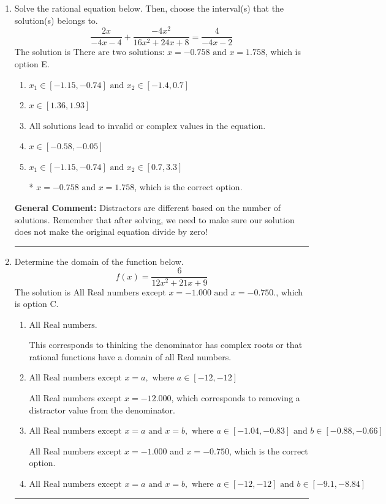 \documentclass{extbook}[14pt]
\newcommand{\litem}[1]{\item #1

\rule{\textwidth}{0.4pt}}
\begin{document}
\begin{enumerate}\litem{
Solve the rational equation below. Then, choose the interval(s) that the solution(s) belongs to.
\[ \frac{2x}{-4x -4} + \frac{-4x^{2}}{16x^{2} +24 x + 8} = \frac{4}{-4x -2} \]The solution is \( \text{There are two solutions: } x = -0.758 \text{ and } x = 1.758 \), which is option E.\begin{enumerate}[label=\Alph*.]
\item \( x_1 \in [-1.15, -0.74] \text{ and } x_2 \in [-1.4,0.7] \)


\item \( x \in [1.36,1.93] \)


\item \( \text{All solutions lead to invalid or complex values in the equation.} \)


\item \( x \in [-0.58,-0.05] \)


\item \( x_1 \in [-1.15, -0.74] \text{ and } x_2 \in [0.7,3.3] \)

* $x = -0.758 \text{ and } x = 1.758$, which is the correct option.
\end{enumerate}

\textbf{General Comment:} Distractors are different based on the number of solutions. Remember that after solving, we need to make sure our solution does not make the original equation divide by zero!
}
\litem{
Determine the domain of the function below.
\[ f(x) = \frac{6}{12x^{2} +21 x + 9} \]The solution is \( \text{All Real numbers except } x = -1.000 \text{ and } x = -0.750. \), which is option C.\begin{enumerate}[label=\Alph*.]
\item \( \text{All Real numbers.} \)

This corresponds to thinking the denominator has complex roots or that rational functions have a domain of all Real numbers.
\item \( \text{All Real numbers except } x = a, \text{ where } a \in [-12, -12] \)

All Real numbers except $x = -12.000$, which corresponds to removing a distractor value from the denominator.
\item \( \text{All Real numbers except } x = a \text{ and } x = b, \text{ where } a \in [-1.04, -0.83] \text{ and } b \in [-0.88, -0.66] \)

All Real numbers except $x = -1.000$ and $x = -0.750$, which is the correct option.
\item \( \text{All Real numbers except } x = a \text{ and } x = b, \text{ where } a \in [-12, -12] \text{ and } b \in [-9.1, -8.84] \)


\end{enumerate}}
\end{enumerate}
\end{document}
